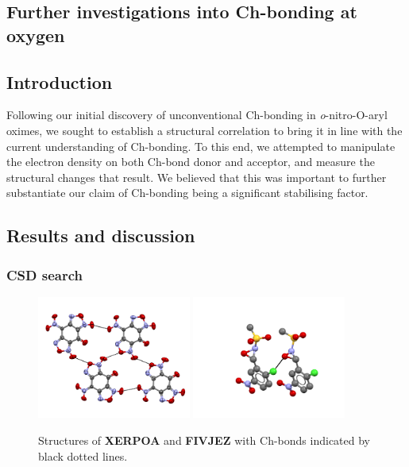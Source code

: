 \begin{refsection}
\chapter{Further investigations into Ch-bonding at oxygen}\label{sec:o-ch-bonding-further}

\section{Introduction}
Following our initial discovery of unconventional Ch-bonding in \emph{o}-nitro-O-aryl oximes, we sought to establish a structural correlation to bring it in line with the current understanding of Ch-bonding.
To this end, we attempted to manipulate the electron density on both Ch-bond donor and acceptor, and measure the structural changes that result.
We believed that this was important to further substantiate our claim of Ch-bonding being a significant stabilising factor.

\section{Results and discussion}

\subsection{CSD search}

\begin{figure}
    \centering
    \includegraphics[width=0.45\textwidth]{Figures/XERPOA.pdf}
    \includegraphics[width=0.45\textwidth]{Figures/FIVJEZ.pdf}
    \caption[Structures of \textbf{XERPOA} and \textbf{FIVJEZ}.]{Structures of \textbf{XERPOA} and \textbf{FIVJEZ} with Ch-bonds indicated by black dotted lines.}\label{fig:furoxan-oxaziridine}
\end{figure}


\end{refsection}
